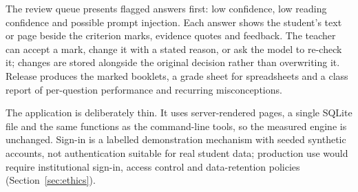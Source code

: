 The review queue presents flagged answers first: low confidence, low reading confidence and possible prompt injection. Each answer shows the student's text or page beside the criterion marks, evidence quotes and feedback. The teacher can accept a mark, change it with a stated reason, or ask the model to re-check it; changes are stored alongside the original decision rather than overwriting it. Release produces the marked booklets, a grade sheet for spreadsheets and a class report of per-question performance and recurring misconceptions.

The application is deliberately thin. It uses server-rendered pages, a single SQLite file and the same functions as the command-line tools, so the measured engine is unchanged. Sign-in is a labelled demonstration mechanism with seeded synthetic accounts, not authentication suitable for real student data; production use would require institutional sign-in, access control and data-retention policies (Section~\ref{sec:ethics}).

